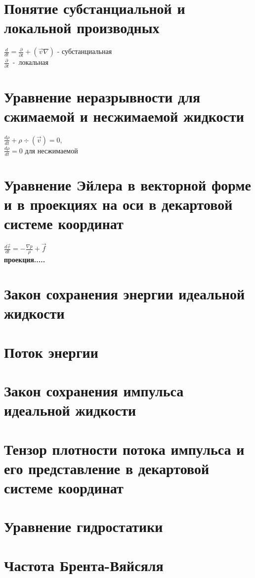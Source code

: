 


	\small
	\begin{multicols*}{5}
		\section{Понятие субстанциальной и локальной производных}
		$\frac{d}{dt}=\frac{\partial}{\partial t}+(\vec{v}\nabla)$ - субстанциальная \\
		$\frac{\partial}{\partial t}$~-~локальная
		
		\section{Уравнение неразрывности для сжимаемой и несжимаемой жидкости}
		$\frac{d\rho}{dt}+\rho \div(\vec{v})=0$, \\
		$\frac{d\rho}{dt}=0$ для несжимаемой 
		
		\section{Уравнение Эйлера в векторной форме и в проекциях на оси в декартовой системе координат}
		$\frac{d\vec{v}}{dt}=-\frac{\nabla p}{\rho}+\vec{f}$ \\
		\textbf{проекция.....}
		\section{Закон сохранения энергии идеальной жидкости}
		\section{Поток энергии}
		\section{Закон сохранения импульса идеальной жидкости}
		\section{Тензор плотности потока импульса и его представление в декартовой системе координат}
		\section{Уравнение гидростатики}
		\section{Частота Брента-Вяйсяля}

\end{multicols*}
